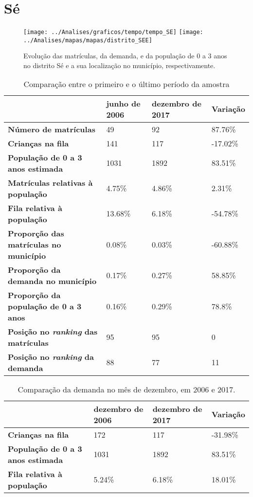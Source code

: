\section{Sé}
\begin{figure}[H]
	\centering
	\texttt{[image: ../Analises/graficos/tempo/tempo\_SE]}
	\texttt{[image: ../Analises/mapas/mapas/distrito\_SEE]}
	\caption{Evolução das matrículas, da demanda, e da população de 0 a 3 anos no distrito Sé e a sua localização no município, respectivamente.}
\end{figure}
\begin{table}[H]
	\begin{tabular}{|l|l|l|l|}
		\hline
		\textbf{}                                      & \textbf{junho de 2006}       & \textbf{dezembro de 2017}    & \textbf{Variação} \\ \hline
		\textbf{Número de matrículas}                  & 49 & 92 & 87.76\% \\ \hline
		\textbf{Crianças na fila}                      & 141 & 117 & -17.02\% \\ \hline
		\textbf{População de 0 a 3 anos estimada}      & 1031 & 1892 & 83.51\% \\ \hline
		\textbf{Matrículas relativas à população}      & 4.75\% & 4.86\% & 2.31\% \\ \hline
		\textbf{Fila relativa à população}             & 13.68\% & 6.18\% & -54.78\% \\ \hline
		\textbf{Proporção das matrículas no município} & 0.08\% & 0.03\% & -60.88\% \\ \hline
		\textbf{Proporção da demanda no município}     & 0.17\% & 0.27\% & 58.85\% \\ \hline
		\textbf{Proporção da população de 0 a 3 anos}  & 0.16\% & 0.29\% & 78.8\% \\ \hline
		\textbf{Posição no \textit{ranking} das matrículas}     & 95 & 95 & 0 \\ \hline
		\textbf{Posição no \textit{ranking} da demanda}         & 88 & 77 & 11 \\ \hline
	\end{tabular}
	\caption{Comparação entre o primeiro e o último período da amostra}
\end{table}
\begin{table}[H]
	\begin{tabular}{|l|l|l|l|}
		\hline
		\textbf{}                                 & \textbf{dezembro de 2006} & \textbf{dezembro de 2017} & \textbf{Variação} \\ \hline
		\textbf{Crianças na fila}                      & 172 & 117 & -31.98\% \\ \hline
		\textbf{População de 0 a 3 anos estimada}      & 1031 & 1892 & 83.51\% \\ \hline
		\textbf{Fila relativa à população}             & 5.24\% & 6.18\% & 18.01\% \\ \hline
	\end{tabular}
	\caption{Comparação da demanda no mês de dezembro, em 2006 e 2017.}
\end{table}
